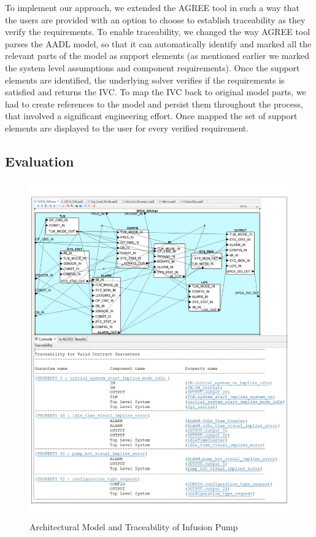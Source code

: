 To implement our approach, we extended the AGREE tool in such a way that the users are provided with an option to choose to establish traceability as they verify the requirements. To enable traceability, we changed the way AGREE tool parses the AADL model, so that it can automatically identify and marked all the relevant parts of the model as support elements (as mentioned earlier we marked the system level assumptions and component requirements). Once the support elements are identified, the underlying solver verifies if the requirements is satisfied and returns the IVC. To map the IVC back to original model parts, we had to create references to the model and persist them throughout the process, that involved a significant engineering effort. Once mapped the set of support elements are displayed to the user for every verified requirement.

\subsection{Evaluation}


\begin{figure}[htb]
\begin{center}
\includegraphics[width=\columnwidth]{images/gpca.pdf}
\caption{Architectural Model and Traceability of Infusion Pump}\label{fig:gpca}
\end{center}
\end{figure}

